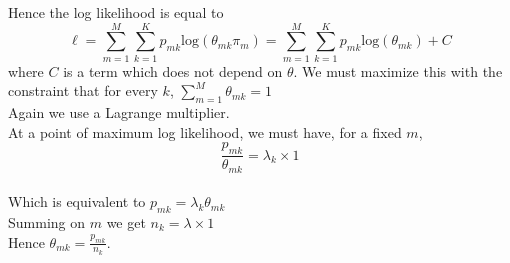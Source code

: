 \documentclass[11pt,a4paper]{article}
\begin{document}
 Hence the log likelihood is equal to $$\ell = \sum\limits_{m=1}^M  \sum\limits_{k=1}^K p_{mk} \mathrm{log}(\theta_{m k} \pi_m) = \sum\limits_{m=1}^M  \sum\limits_{k=1}^K p_{mk} \mathrm{log}(\theta_{m k})  + C$$
 where $C$ is a term which does not depend on $\theta$.
We must maximize this with the constraint that for every $k$, $ \sum\limits_{m=1}^{M}  \theta_{mk} = 1$
\\Again we use a Lagrange multiplier.
\\At a point of maximum log likelihood, we must have, for a fixed $m$, 
%
$$\frac{p_{mk}}{ \theta_{mk}} = \lambda_k \times 1$$
\\Which is equivalent to $p_{mk} = \lambda_k \theta_{mk}$
\\Summing on $m$ we get $n_k = \lambda \times 1$
\\Hence $\theta_{mk} = \frac{p_{mk}}{n_k}$.
\end{document}
